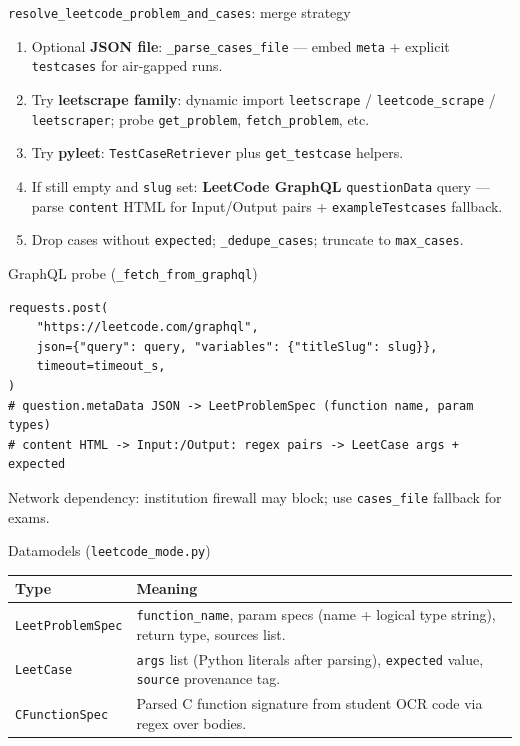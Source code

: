 \documentclass[aspectratio=169]{beamer}
\begin{document}
\begin{frame}{\texttt{resolve\_leetcode\_problem\_and\_cases}: merge strategy}
  \small
  \begin{enumerate}
    \item Optional \textbf{JSON file}: \texttt{\_parse\_cases\_file} --- embed \texttt{meta} + explicit \texttt{testcases} for air-gapped runs.
    \item Try \textbf{leetscrape family}: dynamic import \texttt{leetscrape} / \texttt{leetcode\_scrape} / \texttt{leetscraper}; probe \texttt{get\_problem}, \texttt{fetch\_problem}, etc.
    \item Try \textbf{pyleet}: \texttt{TestCaseRetriever} plus \texttt{get\_testcase} helpers.
    \item If still empty and \texttt{slug} set: \textbf{LeetCode GraphQL} \texttt{questionData} query --- parse \texttt{content} HTML for Input/Output pairs + \texttt{exampleTestcases} fallback.
    \item Drop cases without \texttt{expected}; \texttt{\_dedupe\_cases}; truncate to \texttt{max\_cases}.
  \end{enumerate}
\end{frame}

\begin{frame}[fragile]{GraphQL probe (\texttt{\_fetch\_from\_graphql})}
\begin{lstlisting}[style=py]
requests.post(
    "https://leetcode.com/graphql",
    json={"query": query, "variables": {"titleSlug": slug}},
    timeout=timeout_s,
)
# question.metaData JSON -> LeetProblemSpec (function name, param types)
# content HTML -> Input:/Output: regex pairs -> LeetCase args + expected
\end{lstlisting}
\vfill
\tiny Network dependency: institution firewall may block; use \texttt{cases\_file} fallback for exams.
\end{frame}

\begin{frame}{Datamodels (\texttt{leetcode\_mode.py})}
  \footnotesize
  \begin{tabular}{@{}p{3.4cm}p{10.4cm}@{}}
    \toprule
    Type & Meaning \\
    \midrule
    \texttt{LeetProblemSpec} & \texttt{function\_name}, param specs (name + logical type string), return type, sources list. \\
    \texttt{LeetCase} & \texttt{args} list (Python literals after parsing), \texttt{expected} value, \texttt{source} provenance tag. \\
    \texttt{CFunctionSpec} & Parsed C function signature from student OCR code via regex over bodies. \\
    \bottomrule
  \end{tabular}
\end{frame}
\end{document}
